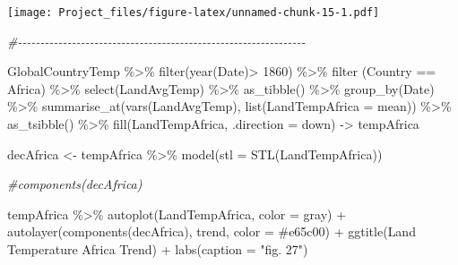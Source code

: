 \documentclass[
]{article}
\newenvironment{Shaded}{\begin{snugshade}}{\end{snugshade}}
\newcommand{\AttributeTok}[1]{\textcolor[rgb]{0.77,0.63,0.00}{#1}}
\newcommand{\CommentTok}[1]{\textcolor[rgb]{0.56,0.35,0.01}{\textit{#1}}}
\newcommand{\DecValTok}[1]{\textcolor[rgb]{0.00,0.00,0.81}{#1}}
\newcommand{\FunctionTok}[1]{\textcolor[rgb]{0.00,0.00,0.00}{#1}}
\newcommand{\NormalTok}[1]{#1}
\newcommand{\OtherTok}[1]{\textcolor[rgb]{0.56,0.35,0.01}{#1}}
\newcommand{\SpecialCharTok}[1]{\textcolor[rgb]{0.00,0.00,0.00}{#1}}
\newcommand{\StringTok}[1]{\textcolor[rgb]{0.31,0.60,0.02}{#1}}
\begin{document}
\texttt{[image: Project\_files/figure-latex/unnamed-chunk-15-1.pdf]}

\begin{Shaded}
\begin{Highlighting}[]
\CommentTok{\#{-}{-}{-}{-}{-}{-}{-}{-}{-}{-}{-}{-}{-}{-}{-}{-}{-}{-}{-}{-}{-}{-}{-}{-}{-}{-}{-}{-}{-}{-}{-}{-}{-}{-}{-}{-}{-}{-}{-}{-}{-}{-}{-}{-}{-}{-}{-}{-}{-}{-}{-}{-}{-}{-}{-}{-}{-}{-}{-}{-}{-}{-}{-}{-}}

\NormalTok{GlobalCountryTemp }\SpecialCharTok{\%\textgreater{}\%}
  \FunctionTok{filter}\NormalTok{(}\FunctionTok{year}\NormalTok{(Date)}\SpecialCharTok{\textgreater{}} \DecValTok{1860}\NormalTok{) }\SpecialCharTok{\%\textgreater{}\%}
  \FunctionTok{filter}\NormalTok{ (Country }\SpecialCharTok{==} \StringTok{\textquotesingle{}Africa\textquotesingle{}}\NormalTok{) }\SpecialCharTok{\%\textgreater{}\%}
  \FunctionTok{select}\NormalTok{(LandAvgTemp) }\SpecialCharTok{\%\textgreater{}\%}
  \FunctionTok{as\_tibble}\NormalTok{() }\SpecialCharTok{\%\textgreater{}\%}
  \FunctionTok{group\_by}\NormalTok{(Date) }\SpecialCharTok{\%\textgreater{}\%} 
  \FunctionTok{summarise\_at}\NormalTok{(}\FunctionTok{vars}\NormalTok{(LandAvgTemp), }\FunctionTok{list}\NormalTok{(}\AttributeTok{LandTempAfrica =}\NormalTok{ mean)) }\SpecialCharTok{\%\textgreater{}\%}
  \FunctionTok{as\_tsibble}\NormalTok{() }\SpecialCharTok{\%\textgreater{}\%}
  \FunctionTok{fill}\NormalTok{(LandTempAfrica, }\AttributeTok{.direction =} \StringTok{\textquotesingle{}down\textquotesingle{}}\NormalTok{) }\OtherTok{{-}\textgreater{}}\NormalTok{ tempAfrica}

\NormalTok{decAfrica }\OtherTok{\textless{}{-}}\NormalTok{ tempAfrica }\SpecialCharTok{\%\textgreater{}\%} 
  \FunctionTok{model}\NormalTok{(}\AttributeTok{stl =} \FunctionTok{STL}\NormalTok{(LandTempAfrica))}

\CommentTok{\#components(decAfrica)}

\NormalTok{tempAfrica }\SpecialCharTok{\%\textgreater{}\%}
  \FunctionTok{autoplot}\NormalTok{(LandTempAfrica, }\AttributeTok{color =} \StringTok{\textquotesingle{}gray\textquotesingle{}}\NormalTok{) }\SpecialCharTok{+} 
  \FunctionTok{autolayer}\NormalTok{(}\FunctionTok{components}\NormalTok{(decAfrica), trend, }\AttributeTok{color =} \StringTok{\textquotesingle{}\#e65c00\textquotesingle{}}\NormalTok{) }\SpecialCharTok{+} 
  \FunctionTok{ggtitle}\NormalTok{(}\StringTok{\textquotesingle{}Land Temperature Africa Trend\textquotesingle{}}\NormalTok{) }\SpecialCharTok{+}
  \FunctionTok{labs}\NormalTok{(}\AttributeTok{caption =} \StringTok{"fig. 27"}\NormalTok{)}
\end{Highlighting}
\end{Shaded}
\end{document}
